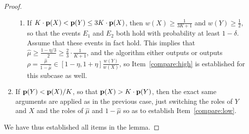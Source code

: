 \begin{proof}
\begin{enumerate}
\begin{enumerate}
  \item If $K\cdot\mathbf{p}(X) < \mathbf{p}(Y) \leq 3K\cdot\mathbf{p}(X)$, then
  $w(X) \geq \frac{1}{3K + 1}$ and $w(Y) \geq \frac{1}{2}$,
  so that the events $E_1$ and $E_2$ both hold
  with probability at least $1-\delta$. Assume that these events in fact
  hold. This implies that
  $\hat{\mu} \geq \frac{1-\eta/3}{2} \geq\frac{2}{3}\cdot\frac{1}{K+1}$,
  and  the algorithm either outputs \high or outputs
  $\rho = \frac{\hat{\mu}}{1-\hat{\mu}} \in [1-\eta,1+\eta]\frac{w(Y)}{w(X)}$,
  so Item~\ref{compare:high} is established for this subcase as well.
  \end{enumerate}
\item If $\mathbf{p}(Y) < \mathbf{p}(X)/K$, so that $\mathbf{p}(X) > K\cdot\mathbf{p}(Y)$, then
the exact same arguments are applied as in the previous case, just
switching the roles of $Y$ and $X$ and the roles of $\hat{\mu}$ and $1-\hat{\mu}$
so as to establish Item~\ref{compare:low}.
\end{enumerate}
We have thus established all items in the lemma.
\end{proof}

